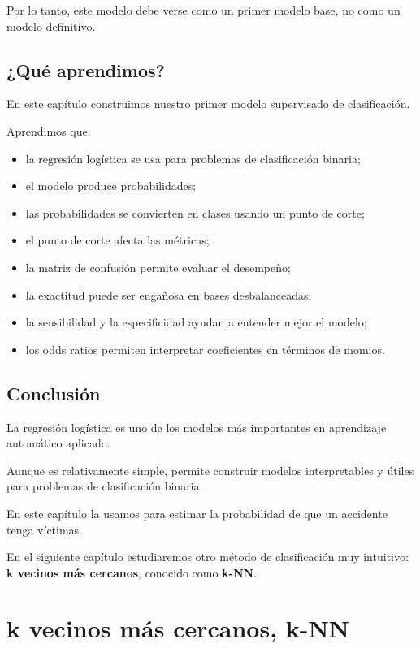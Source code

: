 \documentclass[
  11pt,
  letterpaper,
]{book}
\providecommand{\tightlist}{%
  \setlength{\itemsep}{0pt}\setlength{\parskip}{0pt}}
\begin{document}
Por lo tanto, este modelo debe verse como un primer modelo base, no como
un modelo definitivo.

\section{¿Qué aprendimos?}\label{quuxe9-aprendimos}

En este capítulo construimos nuestro primer modelo supervisado de
clasificación.

Aprendimos que:

\begin{itemize}
\tightlist
\item
  la regresión logística se usa para problemas de clasificación binaria;
\item
  el modelo produce probabilidades;
\item
  las probabilidades se convierten en clases usando un punto de corte;
\item
  el punto de corte afecta las métricas;
\item
  la matriz de confusión permite evaluar el desempeño;
\item
  la exactitud puede ser engañosa en bases desbalanceadas;
\item
  la sensibilidad y la especificidad ayudan a entender mejor el modelo;
\item
  los odds ratios permiten interpretar coeficientes en términos de
  momios.
\end{itemize}

\section{Conclusión}\label{conclusiuxf3n-2}

La regresión logística es uno de los modelos más importantes en
aprendizaje automático aplicado.

Aunque es relativamente simple, permite construir modelos interpretables
y útiles para problemas de clasificación binaria.

En este capítulo la usamos para estimar la probabilidad de que un
accidente tenga víctimas.

En el siguiente capítulo estudiaremos otro método de clasificación muy
intuitivo: \textbf{k vecinos más cercanos}, conocido como \textbf{k-NN}.


\chapter{k vecinos más cercanos,
k-NN}\label{k-vecinos-muxe1s-cercanos-k-nn}
\end{document}
